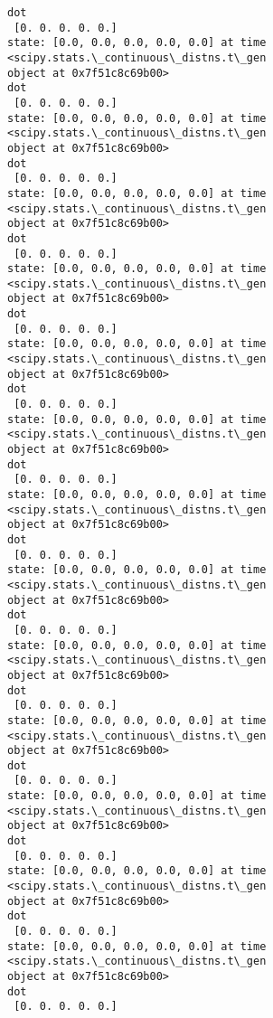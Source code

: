 \documentclass[11pt]{article}
\makeatletter
\newcommand{\boxspacing}{\kern\kvtcb@left@rule\kern\kvtcb@boxsep}
\newcommand{\prompt}[4]{
        \ttfamily\llap{{\color{#2}[#3]:\hspace{3pt}#4}}\vspace{-\baselineskip}
    }
\makeatother
\begin{document}
\begin{Verbatim}[commandchars=\\\{\}]
dot
 [0. 0. 0. 0. 0.]
state: [0.0, 0.0, 0.0, 0.0, 0.0] at time <scipy.stats.\_continuous\_distns.t\_gen
object at 0x7f51c8c69b00>
dot
 [0. 0. 0. 0. 0.]
state: [0.0, 0.0, 0.0, 0.0, 0.0] at time <scipy.stats.\_continuous\_distns.t\_gen
object at 0x7f51c8c69b00>
dot
 [0. 0. 0. 0. 0.]
state: [0.0, 0.0, 0.0, 0.0, 0.0] at time <scipy.stats.\_continuous\_distns.t\_gen
object at 0x7f51c8c69b00>
dot
 [0. 0. 0. 0. 0.]
state: [0.0, 0.0, 0.0, 0.0, 0.0] at time <scipy.stats.\_continuous\_distns.t\_gen
object at 0x7f51c8c69b00>
dot
 [0. 0. 0. 0. 0.]
state: [0.0, 0.0, 0.0, 0.0, 0.0] at time <scipy.stats.\_continuous\_distns.t\_gen
object at 0x7f51c8c69b00>
dot
 [0. 0. 0. 0. 0.]
state: [0.0, 0.0, 0.0, 0.0, 0.0] at time <scipy.stats.\_continuous\_distns.t\_gen
object at 0x7f51c8c69b00>
dot
 [0. 0. 0. 0. 0.]
state: [0.0, 0.0, 0.0, 0.0, 0.0] at time <scipy.stats.\_continuous\_distns.t\_gen
object at 0x7f51c8c69b00>
dot
 [0. 0. 0. 0. 0.]
state: [0.0, 0.0, 0.0, 0.0, 0.0] at time <scipy.stats.\_continuous\_distns.t\_gen
object at 0x7f51c8c69b00>
dot
 [0. 0. 0. 0. 0.]
state: [0.0, 0.0, 0.0, 0.0, 0.0] at time <scipy.stats.\_continuous\_distns.t\_gen
object at 0x7f51c8c69b00>
dot
 [0. 0. 0. 0. 0.]
state: [0.0, 0.0, 0.0, 0.0, 0.0] at time <scipy.stats.\_continuous\_distns.t\_gen
object at 0x7f51c8c69b00>
dot
 [0. 0. 0. 0. 0.]
state: [0.0, 0.0, 0.0, 0.0, 0.0] at time <scipy.stats.\_continuous\_distns.t\_gen
object at 0x7f51c8c69b00>
dot
 [0. 0. 0. 0. 0.]
state: [0.0, 0.0, 0.0, 0.0, 0.0] at time <scipy.stats.\_continuous\_distns.t\_gen
object at 0x7f51c8c69b00>
dot
 [0. 0. 0. 0. 0.]
state: [0.0, 0.0, 0.0, 0.0, 0.0] at time <scipy.stats.\_continuous\_distns.t\_gen
object at 0x7f51c8c69b00>
dot
 [0. 0. 0. 0. 0.]
    \end{Verbatim}

    \begin{center}
    \end{center}
    { \hspace*{\fill} \\}
    
    \begin{tcolorbox}[breakable, size=fbox, boxrule=1pt, pad at break*=1mm,colback=cellbackground, colframe=cellborder]
\prompt{In}{incolor}{ }{\boxspacing}
\begin{Verbatim}[commandchars=\\\{\}]

\end{Verbatim}
\end{tcolorbox}
\end{document}
